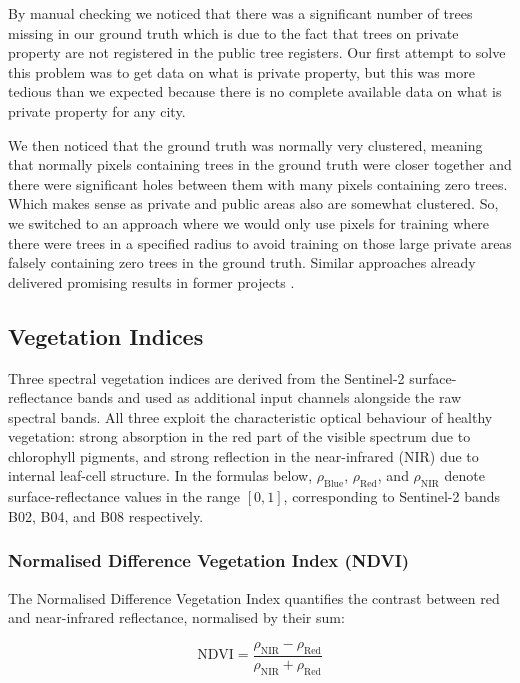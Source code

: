 By manual checking we noticed that there was a significant number of trees missing in our ground truth which is due to the fact that trees on private property are not registered in the public tree registers. Our first attempt to solve this problem was to get data on what is private property, but this was more tedious than we expected because there is no complete available data on what is private property for any city. 

We then noticed that the ground truth was normally very clustered, meaning that normally pixels containing trees in the ground truth were closer together and there were significant holes between them with many pixels containing zero trees. Which makes sense as private and public areas also are somewhat clustered. So, we switched to an approach where we would only use pixels for training where there were trees in a specified radius to avoid training on those large private areas falsely containing zero trees in the ground truth. Similar approaches already delivered promising results in former projects \cite{lin2016scribblesup}.

\subsection{Vegetation Indices}
Three spectral vegetation indices are derived from the Sentinel-2 surface-reflectance bands and used as additional input channels alongside the raw spectral bands. All three exploit the characteristic optical behaviour of healthy vegetation: strong absorption in the red part of the visible spectrum due to chlorophyll pigments, and strong reflection in the near-infrared (NIR) due to internal leaf-cell structure. In the formulas below, $\rho_{\text{Blue}}$, $\rho_{\text{Red}}$, and $\rho_{\text{NIR}}$ denote surface-reflectance values in the range $[0, 1]$, corresponding to Sentinel-2 bands B02, B04, and B08 respectively.

\subsubsection*{Normalised Difference Vegetation Index (NDVI)}
The Normalised Difference Vegetation Index \cite{tucker1979} quantifies the contrast between red and near-infrared reflectance, normalised by their sum:

\begin{equation}
    \text{NDVI} = \frac{\rho_{\text{NIR}} - \rho_{\text{Red}}}
                       {\rho_{\text{NIR}} + \rho_{\text{Red}}}
    \label{eq:ndvi}
\end{equation}

